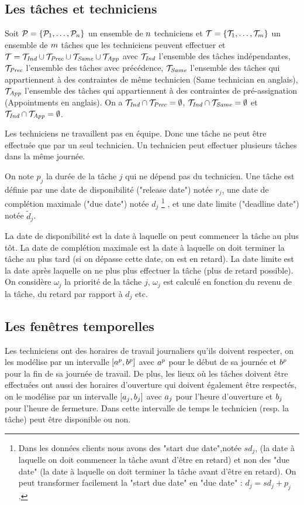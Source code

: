 
\subsection{Les tâches et techniciens}
Soit $\mathcal{P}=\{\mathcal{P}_1,\ldots,\mathcal{P}_n \}$ un ensemble de $n$ techniciens et $\mathcal{T}=\{\mathcal{T}_1,\ldots,\mathcal{T}_{m}\} $ un ensemble de $m$ tâches que les techniciens peuvent effectuer et $\mathcal{T} = \mathcal{T}_{\textit{Ind}} \cup \mathcal{T}_{\textit{Prec}} \cup \mathcal{T}_{\textit{Same}} \cup \mathcal{T}_{\textit{App}}$ avec $\mathcal{T}_{\textit{Ind}}$ l'ensemble des tâches indépendantes, $\mathcal{T}_{\textit{Prec}}$ l'ensemble des tâches avec précédence, $\mathcal{T}_{\textit{Same}}$ l'ensemble des tâches qui appartiennent à des contraintes de même technicien (Same technician en anglais), $\mathcal{T}_{\textit{App}}$ l'ensemble des tâches qui appartiennent à des contraintes de pré-assignation (Appointments en anglais). On a $\mathcal{T}_{\textit{Ind}} \cap \mathcal{T}_{\textit{Prec}} = \emptyset$, $\mathcal{T}_{\textit{Ind}} \cap \mathcal{T}_{\textit{Same}} = \emptyset$ et $\mathcal{T}_{\textit{Ind}} \cap \mathcal{T}_{\textit{App}} = \emptyset$.

Les techniciens ne travaillent pas en équipe. Donc une tâche ne peut être effectuée que par un seul technicien. Un technicien peut effectuer plusieurs tâches dans la même journée.

On note $p_j$ la durée de la tâche $j$ qui ne dépend pas du technicien. 
Une tâche est définie par une date de  disponibilité ("release date") notée $r_j$, une date de complétion maximale ("due date") notée $d_j$
\footnote{Dans les données clients nous avons des "start due date",notée $sd_j$, (la date à laquelle on doit commencer la tâche avant d'être en retard) et non des "due date" (la date à laquelle on doit terminer la tâche avant d'être en retard). On peut transformer facilement la "start due date" en "due date" : $d_j = sd_j + p_j$.}
, et une date limite ("deadline date") notée $\tilde{d}_j$.


La date de disponibilité est la date à laquelle on peut commencer la tâche au plus tôt. 
La date de complétion maximale est la date à laquelle on doit terminer la tâche au plus tard (si on dépasse cette date, on est en retard).
La date limite est la date après laquelle on ne plus plus effectuer la tâche (plus de retard possible).
On considère $\omega_j$ la priorité de la tâche $j$, $\omega_j$ est calculé en fonction du revenu de la tâche, du retard par rapport à $d_j$ etc.
\subsection{Les fenêtres temporelles}
Les techniciens ont des horaires de travail journaliers qu'ils doivent respecter, on les modélise par un intervalle $[\htech{1}{p},\htech{2}{p}]$ avec $\htech{1}{p}$ pour le début de sa journée et $\htech{2}{p}$ pour la fin de sa journée de travail. De plus, les lieux où les tâches doivent être effectuées ont aussi des horaires d'ouverture qui doivent également être respectés, on le modélise par un intervalle $[\htask{j}{1},\htask{j}{2}]$ avec $\htask{j}{1}$ pour l'heure d'ouverture et $\htask{j}{2}$ pour l'heure de fermeture.
Dans cette intervalle de temps le technicien (resp. la tâche) peut être disponible ou non.

